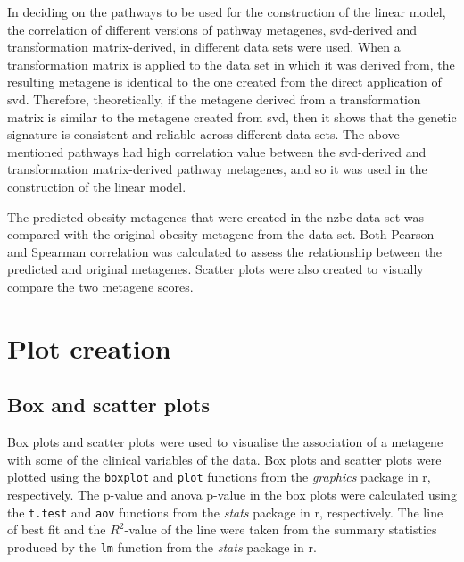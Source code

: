 In deciding on the pathways to be used for the construction of the linear model, the correlation of different versions of pathway metagenes, \gls{svd}-derived and transformation matrix-derived, in different data sets were used.
When a transformation matrix is applied to the data set in which it was derived from, the resulting metagene is identical to the one created from the direct application of \gls{svd}.
Therefore, theoretically, if the metagene derived from a transformation matrix is similar to the metagene created from \gls{svd}, then it shows that the genetic signature is consistent and reliable across different data sets.
The above mentioned pathways had high correlation value between the \gls{svd}-derived and transformation matrix-derived pathway metagenes, and so it was used in the construction of the linear model.


The predicted obesity metagenes that were created in the \gls{nzbc} data set was compared with the original obesity metagene from the \citet{Creighton2012} data set.
Both Pearson and Spearman correlation was calculated to assess the relationship between the predicted and original metagenes.
Scatter plots were also created to visually compare the two metagene scores.

\section{Plot creation}
\label{sec:plot_creation}

\subsection{Box and scatter plots}
\label{sub:box_and_scatter_plots}

Box plots and scatter plots were used to visualise the association of a metagene with some of the clinical variables of the data.
Box plots and scatter plots were plotted using the \texttt{boxplot} and \texttt{plot} functions from the \textit{graphics} package in \gls{r}, respectively.
The p-value and \gls{anova} p-value in the box plots were calculated using the \texttt{t.test} and \texttt{aov} functions from the \textit{stats} package in \gls{r}, respectively.
The line of best fit and the $R^2$-value of the line were taken from the summary statistics produced by the \texttt{lm} function from the \textit{stats} package in \gls{r}.

